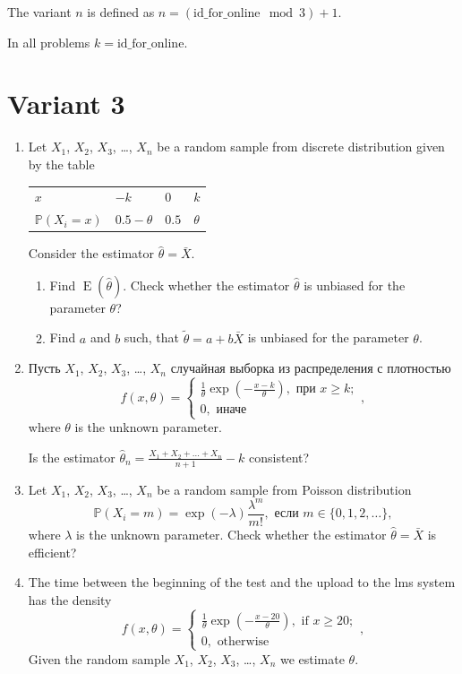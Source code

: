 \documentclass[12pt]{article}
\DeclareMathOperator{\E}{E}
\def \P{\mathbb{P}}
\newcommand \id {\mathrm{id}\_\mathrm{for}\_\mathrm{online}}
\begin{document}
\newpage

The variant $n$ is defined as $n=(\id \mod 3)+1$. 

In all problems $k=\id$.

\section*{Variant 3}
\begin{enumerate}

\item  Let $X_1$, $X_2$, $X_3$, \ldots, $X_n$  be a random sample from 
discrete distribution given by the table

\begin{tabular}{@{}llll@{}}
  \toprule
   $x$           & $-k$ & $0$ & $k$ \\ 
   $\P(X_i = x)$ & $0.5-\theta$ & $0.5$ & $\theta$ \\
  \bottomrule
\end{tabular}
			
Consider the estimator $\hat \theta = \bar X$.
\begin{enumerate}
\item Find $\E(\hat \theta)$. 
Check whether the estimator $\hat \theta$ is unbiased for the parameter $\theta$?
\item Find $a$ and $b$ such, 
that $\tilde \theta = a + b\bar X$ is unbiased for the parameter $\theta$.
\end{enumerate} 



\item Пусть $X_1$, $X_2$, $X_3$, \ldots, $X_n$ случайная выборка из распределения с плотностью
\[
  f(x, \theta) = \begin{cases}
    \frac{1}{\theta}\exp\left(-\frac{x-k}{\theta}\right), \text{ при } x\geq k; \\
    0, \text{ иначе}
  \end{cases},    
\]
where $\theta$  is the unknown parameter. 

Is the estimator $\hat\theta_n = \frac{X_1 + X_2 + \ldots + X_n}{n+1} - k$ consistent?


\item Let $X_1$, $X_2$, $X_3$, \ldots, $X_n$ 
be a random sample from Poisson distribution
\[
\P(X_i = m) = \exp(-\lambda)\frac{\lambda^m}{m!}, \text{ если } m \in \{0, 1, 2, \ldots\},
\]
where $\lambda$  is the unknown parameter. 
Check whether the estimator $\hat\theta = \bar X$ is efficient?


\item  The time between the beginning of the test and the upload to the lms system
has the density
\[
  f(x, \theta) = \begin{cases}
    \frac{1}{\theta}\exp\left(-\frac{x-20}{\theta}\right), \text{ if } x\geq 20; \\
    0, \text{ otherwise}
  \end{cases},    
\]
Given the random sample $X_1$, $X_2$, $X_3$, \ldots, $X_n$ we estimate $\theta$. 


\end{enumerate}
\end{document}
